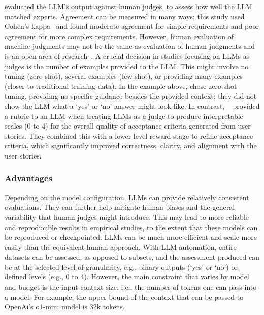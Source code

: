 \citeauthor{DBLP:conf/re/LubosFTGMEL24} evaluated the LLM's output against human judges, to assess how well the LLM matched experts. 
Agreement can be measured in many ways; this study used Cohen's kappa~\cite{cohen60} and found moderate agreement for simple requirements and poor agreement for more complex requirements.
However, human evaluation of machine judgments may not be the same as evaluation of human judgments and is an open area of research~\cite{DBLP:journals/corr/abs-2410-03775}. 
A crucial decision in studies focusing on LLMs as judges is the number of examples provided to the LLM.
This might involve no tuning (zero-shot), several examples (few-shot), or providing many examples (closer to traditional training data).
In the example above, \citeauthor{DBLP:conf/re/LubosFTGMEL24} chose zero-shot tuning, providing no specific guidance besides the provided context; they did not show the LLM what a `yes' or `no' answer might look like. 
In contrast, \citeauthor{wang2025multimodalrequirementsdatabasedacceptance}~\cite{wang2025multimodalrequirementsdatabasedacceptance} provided a rubric to an LLM when treating LLMs as a judge to produce interpretable scales (0 to 4) for the overall quality of acceptance criteria generated from user stories.
They combined this with a lower-level reward stage to refine acceptance criteria, which significantly improved correctness, clarity, and alignment with the user stories.

\subsubsection{Advantages}

Depending on the model configuration, LLMs can provide relatively consistent evaluations.
They can further help mitigate human biases and the general variability that human judges might introduce.
This may lead to more reliable and reproducible results in empirical studies, to the extent that these models can be reproduced or checkpointed.
LLMs can be much more efficient and scale more easily than the equivalent human approach.
With LLM automation, entire datasets can be assessed, as opposed to subsets, and the assessment produced can be at the selected level of granularity, e.g., binary outputs (`yes' or `no') or defined levels (e.g., 0 to 4).
However, the main constraint that varies by model and budget is the input context size, i.e., the number of tokens one can pass into a model.
For example, the upper bound of the context that can be passed to OpenAi's \textsf{o1-mini} model is \href{https://help.openai.com/en/articles/9855712-openai-o1-models-faq-chatgpt-enterprise-and-edu}{32k tokens}.

